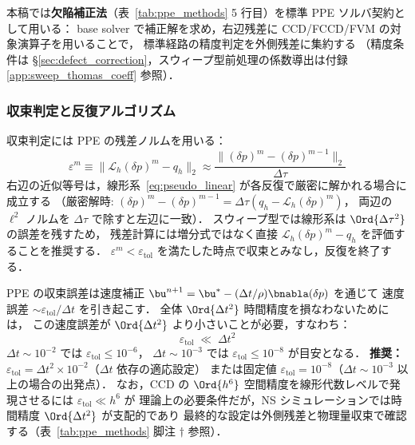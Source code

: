 本稿では\textbf{欠陥補正法}（表~\ref{tab:ppe_methods} 5 行目）を標準 PPE ソルバ契約として用いる：
base solver で補正解を求め，右辺残差に CCD/FCCD/FVM の対象演算子を用いることで，
標準経路の精度判定を外側残差に集約する
（精度条件は §\ref{sec:defect_correction}，スウィープ型前処理の係数導出は付録 \ref{app:sweep_thomas_coeff} 参照）．

\subsubsection{収束判定と反復アルゴリズム}
\label{sec:pseudo_convergence}

収束判定には PPE の残差ノルムを用いる：
\begin{equation}
  \varepsilon^m \equiv \bigl\|\mathcal{L}_h(\delta p)^m - q_h\bigr\|_2
  \approx \frac{\bigl\|(\delta p)^m - (\delta p)^{m-1}\bigr\|_2}{\Delta\tau}
  \label{eq:residual}
\end{equation}
右辺の近似等号は，線形系~\eqref{eq:pseudo_linear} が各反復で厳密に解かれる場合に成立する
（厳密解時: $(\delta p)^m - (\delta p)^{m-1} = \Delta\tau(q_h - \mathcal{L}_h(\delta p)^m)$，
両辺の $\ell^2$ ノルムを $\Delta\tau$ で除すと左辺に一致）．
スウィープ型では線形系は $\Ord{\Delta\tau^2}$ の誤差を残すため，
残差計算には増分式ではなく直接 $\mathcal{L}_h(\delta p)^m - q_h$ を評価することを推奨する．
$\varepsilon^m < \varepsilon_{\mathrm{tol}}$ を満たした時点で収束とみなし，反復を終了する．

\begin{tcolorbox}[resultbox, title={$\varepsilon_{\mathrm{tol}}$ 選択の実用基準}]
\label{result:etol_criterion}
PPE の収束誤差は速度補正 $\bu^{n+1} = \bu^* - (\Delta t/\rho)\bnabla(\delta p)$ を通じて
速度誤差 $\sim \varepsilon_\mathrm{tol}/\Delta t$ を引き起こす．
全体 $\Ord{\Delta t^2}$ 時間精度を損なわないためには，
この速度誤差が $\Ord{\Delta t^2}$ より小さいことが必要，すなわち：
\begin{equation}
  \varepsilon_\mathrm{tol} \;\ll\; \Delta t^2
  \label{eq:etol_physical}
\end{equation}
$\Delta t \sim 10^{-2}$ では $\varepsilon_\mathrm{tol} \leq 10^{-6}$，
$\Delta t \sim 10^{-3}$ では $\varepsilon_\mathrm{tol} \leq 10^{-8}$ が目安となる．
\textbf{推奨：} $\varepsilon_\mathrm{tol} = \Delta t^2 \times 10^{-2}$（$\Delta t$ 依存の適応設定）
または固定値 $\varepsilon_\mathrm{tol} = 10^{-8}$（$\Delta t \sim 10^{-3}$ 以上の場合の出発点）．
なお，CCD の $\Ord{h^6}$ 空間精度を線形代数レベルで発現させるには $\varepsilon_\mathrm{tol} \ll h^6$ が
理論上の必要条件だが，NS シミュレーションでは時間精度 $\Ord{\Delta t^2}$ が支配的であり
最終的な設定は外側残差と物理量収束で確認する（表~\ref{tab:ppe_methods} 脚注 $\dagger$ 参照）．
\end{tcolorbox}

